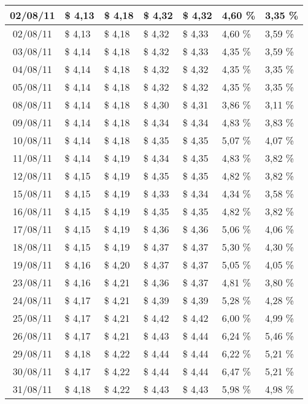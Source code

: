 \begin{center}
\begin{longtable}{|c|p{1.5cm}|p{1.5cm}|p{1.5cm}|p{1.5cm}|p{1.5cm}|p{1.5cm}|}
02/08/11 & \$ 4,13 & \$ 4,18 & \$ 4,32 & \$ 4,32 & 4,60 \% & 3,35 \% \\ \hline
02/08/11 & \$ 4,13 & \$ 4,18 & \$ 4,32 & \$ 4,33 & 4,60 \% & 3,59 \% \\ \hline
03/08/11 & \$ 4,14 & \$ 4,18 & \$ 4,32 & \$ 4,33 & 4,35 \% & 3,59 \% \\ \hline
04/08/11 & \$ 4,14 & \$ 4,18 & \$ 4,32 & \$ 4,32 & 4,35 \% & 3,35 \% \\ \hline
05/08/11 & \$ 4,14 & \$ 4,18 & \$ 4,32 & \$ 4,32 & 4,35 \% & 3,35 \% \\ \hline
08/08/11 & \$ 4,14 & \$ 4,18 & \$ 4,30 & \$ 4,31 & 3,86 \% & 3,11 \% \\ \hline
09/08/11 & \$ 4,14 & \$ 4,18 & \$ 4,34 & \$ 4,34 & 4,83 \% & 3,83 \% \\ \hline
10/08/11 & \$ 4,14 & \$ 4,18 & \$ 4,35 & \$ 4,35 & 5,07 \% & 4,07 \% \\ \hline
11/08/11 & \$ 4,14 & \$ 4,19 & \$ 4,34 & \$ 4,35 & 4,83 \% & 3,82 \% \\ \hline
12/08/11 & \$ 4,15 & \$ 4,19 & \$ 4,35 & \$ 4,35 & 4,82 \% & 3,82 \% \\ \hline
15/08/11 & \$ 4,15 & \$ 4,19 & \$ 4,33 & \$ 4,34 & 4,34 \% & 3,58 \% \\ \hline
16/08/11 & \$ 4,15 & \$ 4,19 & \$ 4,35 & \$ 4,35 & 4,82 \% & 3,82 \% \\ \hline
17/08/11 & \$ 4,15 & \$ 4,19 & \$ 4,36 & \$ 4,36 & 5,06 \% & 4,06 \% \\ \hline
18/08/11 & \$ 4,15 & \$ 4,19 & \$ 4,37 & \$ 4,37 & 5,30 \% & 4,30 \% \\ \hline
19/08/11 & \$ 4,16 & \$ 4,20 & \$ 4,37 & \$ 4,37 & 5,05 \% & 4,05 \% \\ \hline
23/08/11 & \$ 4,16 & \$ 4,21 & \$ 4,36 & \$ 4,37 & 4,81 \% & 3,80 \% \\ \hline
24/08/11 & \$ 4,17 & \$ 4,21 & \$ 4,39 & \$ 4,39 & 5,28 \% & 4,28 \% \\ \hline
25/08/11 & \$ 4,17 & \$ 4,21 & \$ 4,42 & \$ 4,42 & 6,00 \% & 4,99 \% \\ \hline
26/08/11 & \$ 4,17 & \$ 4,21 & \$ 4,43 & \$ 4,44 & 6,24 \% & 5,46 \% \\ \hline
29/08/11 & \$ 4,18 & \$ 4,22 & \$ 4,44 & \$ 4,44 & 6,22 \% & 5,21 \% \\ \hline
30/08/11 & \$ 4,17 & \$ 4,22 & \$ 4,44 & \$ 4,44 & 6,47 \% & 5,21 \% \\ \hline
31/08/11 & \$ 4,18 & \$ 4,22 & \$ 4,43 & \$ 4,43 & 5,98 \% & 4,98 \% \\ \hline

\end{longtable}
\end{center}
